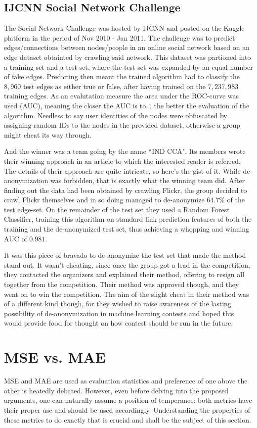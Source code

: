 \documentclass[english, a4paper]{article}
\begin{document}
\subsection{IJCNN Social Network Challenge}
The Social Network Challenge was hosted by IJCNN and posted on the Kaggle platform in the period of Nov 2010 - Jan 2011. The challenge was to predict edges/connections between nodes/people in an online social network based on an edge dataset obtainted by crawling said network. This dataset was partioned into a training set and a test set, where the test set was expanded by an equal number of fake edges. Predicting then meant the trained algorithm had to classify the $8,960$ test edges as either true or false, after having trained on the $7,237,983$ training edges. As an evalutation measure the area under the ROC-curve was used (AUC), meaning the closer the AUC is to $1$ the better the evaluation of the algorithm. Needless to say user identities of the nodes were obfuscated by assigning random IDs to the nodes in the provided dataset, otherwise a group might cheat its way through.

And the winner was a team going by the name ``IND CCA". Its members wrote their winning approach in an article \cite{6033446} to which the interested reader is referred. The details of their approach are quite intricate, so here's the gist of it. While de-anonymization was forbidden, that is exactly what the winning team did. After finding out the data had been obtained by crawling Flickr, the group decided to crawl Flickr themselves and in so doing managed to de-anonymize $64.7 \%$ of the test edge-set. On the remainder of the test set they used a Random Forest Classifier, training this algorithm on standard link prediction features of both the training and the de-anonymized test set, thus achieving a whopping and winning AUC of $0.981$.

It was this piece of bravado to de-anonymize the test set that made the method stand out. It wasn't cheating, since once the group got a lead in the competition, they contacted the organizers and explained their method, offering to resign all together from the competition. Their method was approved though, and they went on to win the competition. The aim of the slight cheat in their method was of a different kind though, for they wished to raise awareness of the lasting possibility of de-anonymization in machine learning contests and hoped this would provide food for thought on how contest should be run in the future.

\section{MSE vs. MAE}
MSE and MAE are used as evaluation statistics and preference of one above the other is heatedly debated. However, even before delving into the proposed arguments, one can naturally assume a position of temperance: both metrics have their proper use and should be used accordingly. Understanding the properties of these metrics to do exactly that is crucial and shall be the subject of this section.
\end{document}
